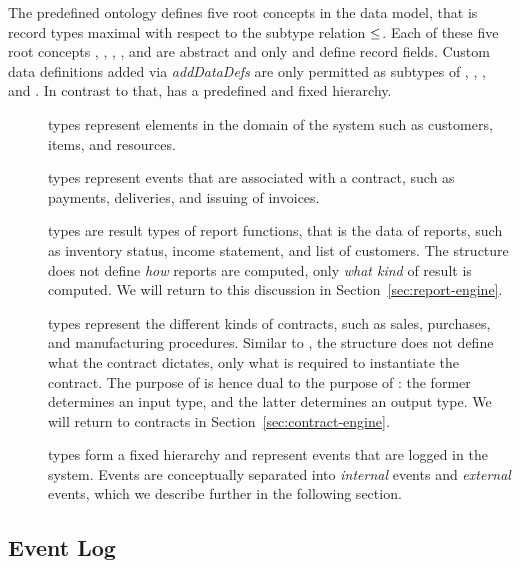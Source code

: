 The predefined ontology defines five root concepts in the data model,
that is record types maximal with respect to the subtype relation
$\le$. Each of these five root concepts ,
, , , and
 are abstract and only  and
 define record fields. Custom data definitions
added via \emph{addDataDefs} are only permitted as subtypes of
, , , and
. In contrast to that,  has a
predefined and fixed hierarchy.
\begin{description}
\item[] types represent elements in the domain of the
  system such as customers, items, and resources.
\item[] types represent events that are
  associated with a contract, such as payments, deliveries, and issuing
  of invoices.
\item[] types are result types of report functions,
  that is the data of reports, such as inventory status, income
  statement, and list of customers. The  structure
  does not define \emph{how} reports are computed, only \emph{what
    kind} of result is computed. We will return to this discussion in
  Section~\ref{sec:report-engine}.
\item[] types represent the different kinds of
  contracts, such as sales, purchases, and manufacturing
  procedures. Similar to , the structure does not
  define what the contract dictates, only what is required to
  instantiate the contract. The purpose of  is
  hence dual to the purpose of : the former
  determines an input type, and the latter determines an output type. We
  will return to contracts in Section~\ref{sec:contract-engine}.
\item[] types form a fixed hierarchy and represent
  events that are logged in the system. Events are conceptually
  separated into \emph{internal} events and \emph{external} events,
  which we describe further in the following section.
\end{description}

\subsection{Event Log}
\label{sec:event-log}

